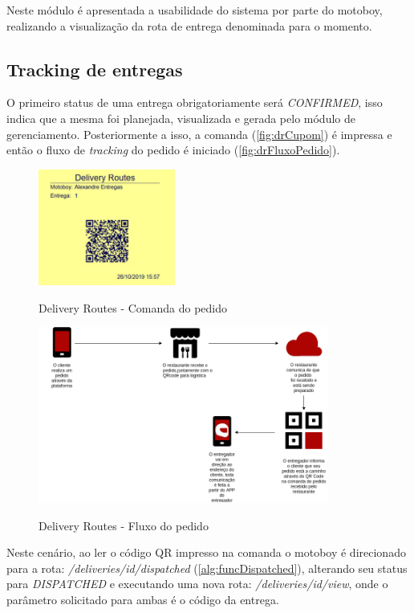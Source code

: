 Neste módulo é apresentada a usabilidade do sistema por parte do motoboy, realizando a visualização da rota de entrega denominada para o momento.

\subsection{Tracking de entregas}
O primeiro status de uma entrega obrigatoriamente será \textit{CONFIRMED}, isso indica que a mesma foi planejada, visualizada e gerada pelo módulo de gerenciamento. Posteriormente a isso, a comanda (\autoref{fig:drCupom}) é impressa e então o fluxo de \textit{tracking} do pedido é iniciado (\autoref{fig:drFluxoPedido}).

 \begin{figure}[H]
    \centering
    \caption{Delivery Routes - Comanda do pedido}
    \includegraphics[width=0.4\textwidth]{./dados/figuras/fig24}
    \label{fig:drCupom}
\end{figure}

\begin{figure}[H]
    \centering
    \caption{Delivery Routes - Fluxo do pedido}
    \includegraphics[width=0.85\textwidth]{./dados/figuras/fig25}
    \label{fig:drFluxoPedido}
\end{figure}

Neste cenário, ao ler o código QR impresso na comanda o motoboy é direcionado para a rota: \textit{/deliveries/{id}/dispatched} (\autoref{alg:funcDispatched}), alterando seu status para \textit{DISPATCHED} e executando uma nova rota: \textit{/deliveries/{id}/view}, onde o parâmetro solicitado para ambas é o código da entrega.

